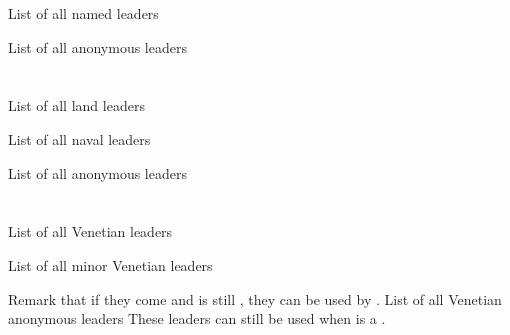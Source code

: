 \aparag List of all named leaders 

\aparag List of all anonymous leaders \listanonymesuedeM




\section{\paysmajeurTurquie}

\aparag List of all land leaders 

\aparag List of all naval leaders 

\aparag List of all anonymous leaders \listanonymeturquie




\section{\paysmajeurVenise}

\aparag List of all Venetian leaders 

\aparag List of all minor Venetian leaders 

\bparag Remark that if they come and \paysVenise is still \MAJ, they can be
used by \VEN.
\aparag List of all Venetian anonymous leaders
\bparag These leaders can still be used when \paysVenise is a \MIN.
\listanonymevenise


